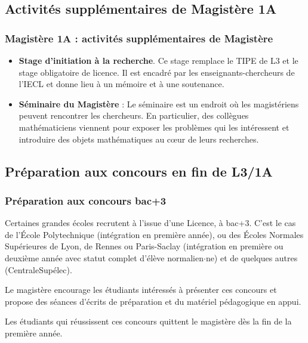 \documentclass[slidetop,11pt]{beamer}
\begin{document}
\subsection{Activités supplémentaires de Magistère 1A}
\begin{frame}
\frametitle{Magistère 1A : activités supplémentaires de Magistère}

\begin{itemize}
\item \textbf{Stage d'initiation à la recherche}. Ce stage remplace le TIPE de L3 et le stage obligatoire de licence. Il est encadré par les enseignants-chercheurs de l'IECL et donne lieu à un mémoire et à une soutenance.
\item \textbf{Séminaire du Magistère} : Le séminaire est un endroit où les magistériens peuvent rencontrer les chercheurs.
En particulier, des collègues mathématiciens viennent pour exposer les problèmes qui les intéressent et introduire des objets mathématiques au cœur de leurs recherches.
\end{itemize}
\end{frame}

\subsection{Préparation aux concours en fin de L3/1A}

\begin{frame}
\frametitle{Préparation aux concours bac+3}

Certaines grandes écoles recrutent à l’issue d’une Licence, à bac+3.
C’est le cas de l’École Polytechnique (intégration en première année), ou des Écoles Normales Supérieures de Lyon, de Rennes ou Paris-Saclay (intégration en première ou deuxième année avec statut complet d’élève normalien$\cdot$ne) et de quelques autres (CentraleSupélec). 

\bigskip
Le magistère encourage  les étudiants intéressés à présenter ces concours et propose des séances d’écrits de préparation et du matériel pédagogique en appui.

\bigskip
Les étudiants qui réussissent ces concours quittent le magistère dès la fin de la première année.
\end{frame}
\end{document}
